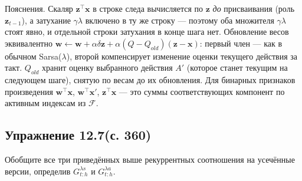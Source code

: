 \begin{solution}
    Пояснения. Скаляр $\mathbf z^\top\mathbf x$ в строке следа вычисляется по $\mathbf z$
    \emph{до} присваивания (роль $\mathbf z_{t-1}$), а затухание $\gamma\lambda$
    включено в ту же строку --- поэтому оба множителя $\gamma\lambda$ стоят явно, и
    отдельной строки затухания в конце шага нет. Обновление весов эквивалентно
    $\mathbf w\leftarrow \mathbf w+\alpha\delta\mathbf z+\alpha(Q-Q_{old})(\mathbf z-\mathbf x)$:
    первый член --- как в обычном Sarsa($\lambda$), второй компенсирует изменение
    оценки текущего действия за такт. $Q_{old}$ хранит оценку выбранного действия
    $A'$ (которое станет текущим на следующем шаге), снятую по весам до их
    обновления. Для бинарных признаков произведения $\mathbf w^\top\mathbf x$,
    $\mathbf w^\top\mathbf x'$, $\mathbf z^\top\mathbf x$ --- это суммы соответствующих
    компонент по активным индексам из $\mathcal F$.
\end{solution}

\subsection{Упражнение 12.7(с. 360)}
Обобщите все три приведённых выше рекуррентных соотношения на усечённые версии,
определив $G_{t:h}^{\lambda s}$ и $G_{t:h}^{\lambda a}$.

